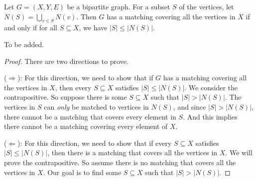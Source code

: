 \begin{flex}
\begin{theorem} \label{theorem:Halls-Theorem}
Let $G = (X,Y,E)$ be a bipartite graph. For a subset $S$ of the vertices, let $N(S) = \bigcup_{v \in S} N(v)$. Then $G$ has a matching covering all the vertices in $X$ if and only if for all $S \subseteq X$, we have $|S| \leq |N(S)|$.
\end{theorem}

\begin{gram}
To be added.
\end{gram}

\begin{proof}
There are two directions to prove.

\noindent
($\Longrightarrow$): For this direction, we need to show that if $G$ has a matching covering all the vertices in $X$, then every $S \subseteq X$ satisfies $|S| \leq |N(S)|$. We consider the contrapositive. So suppose there is some $S \subseteq X$ such that $|S| > |N(S)|$. The vertices in $S$ can \emph{only} be matched to vertices in $N(S)$, and since $|S| > |N(S)|$, there cannot be a matching that covers every element in $S$. And this implies there cannot be a matching covering every element of $X$.

\noindent
($\Longleftarrow$): For this direction, we need to show that if every $S \subseteq X$ satisfies $|S| \leq |N(S)|$, then there is a matching that covers all the vertices in $X$. We will prove the contrapositive. So assume there is no matching that covers all the vertices in $X$. Our goal is to find some $S \subseteq X$ such that $|S| > |N(S)|$. 


\end{proof}
\end{flex}
